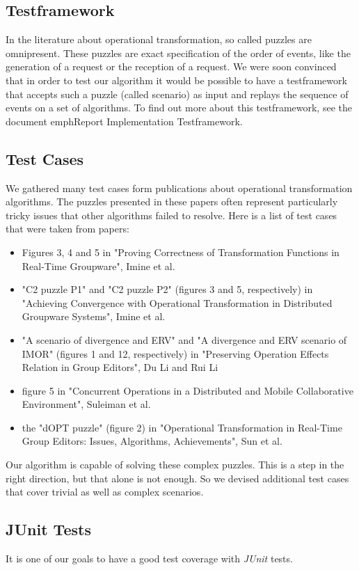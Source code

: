 \subsection{Testframework}
In the literature about operational transformation, so called puzzles are omnipresent. These puzzles are exact specification of the order of events, like the generation of a request or the reception of a request. We were soon convinced that in order to test our algorithm it would be possible to have a testframework that accepts such a puzzle (called scenario) as input and replays the sequence of events on a set of algorithms. To find out more about this testframework, see the document emph{Report Implementation Testframework}.

\subsection{Test Cases}
We gathered many test cases form publications about operational transformation algorithms. The puzzles presented in these papers often represent particularly tricky issues that other algorithms failed to resolve. Here is a list of test cases that were taken from papers:

\begin{itemize}
 \item Figures 3, 4 and 5 in "Proving Correctness of Transformation Functions in Real-Time Groupware", Imine et al.
 \item "C2 puzzle P1" and "C2 puzzle P2" (figures 3 and 5, respectively) in "Achieving Convergence with Operational Transformation in Distributed Groupware Systems", Imine et al.
 \item "A scenario of divergence and ERV" and  "A divergence and ERV scenario of IMOR" (figures 1 and 12, respectively) in "Preserving Operation Effects Relation in Group Editors", Du Li and Rui Li
 \item figure 5 in "Concurrent Operations in a Distributed and Mobile Collaborative Environment", Suleiman et al.
 \item the "dOPT puzzle" (figure 2) in "Operational Transformation in Real-Time Group Editors: Issues, Algorithms, Achievements", Sun et al. 
\end{itemize}

Our algorithm is capable of solving these complex puzzles. This is a step in the right direction, but that alone is not enough. So we devised additional test cases that cover trivial as well as complex scenarios.

\subsection{JUnit Tests}
It is one of our goals to have a good test coverage with \emph{JUnit} tests.

